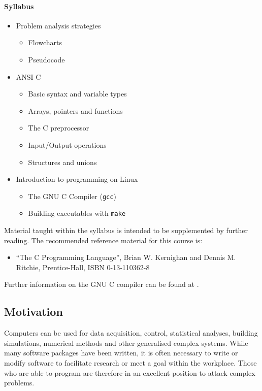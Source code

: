 \documentclass[11pt]{scrartcl}
\def\psc{Pseudocode}
\def\linux{Linux}
\begin{document}
\paragraph{Syllabus}
\begin{itemize}
  \item Problem analysis strategies
  \begin{itemize}
    \item Flowcharts
    \item \psc 
  \end{itemize}
  \item ANSI C
  \begin{itemize}
    \item Basic syntax and variable types
    \item Arrays, pointers and functions
    \item The C preprocessor
    \item Input/Output operations
    \item Structures and unions 
  \end{itemize}
  \item Introduction to programming on \linux
  \begin{itemize}
    \item The GNU C Compiler (\texttt{gcc})
    \item Building executables with \texttt{make} 
  \end{itemize}
\end{itemize}

Material taught within the syllabus is intended to be supplemented by
further reading. The recommended reference material for this course
is:
\begin{itemize}
\item ``The C Programming Language'', Brian W. Kernighan and Dennis M. Ritchie, Prentice-Hall, ISBN 0-13-110362-8
\end{itemize}
Further information on the GNU C compiler can be found at \cite{gcc}.

\subsection{Motivation}
Computers can be used for data acquisition, control, statistical analyses, building simulations, numerical methods and other generalised complex systems.  While many software packages have been written, it is often necessary to write or modify software to facilitate research or meet a goal within the workplace.  Those who are able to program are therefore in an excellent position to attack complex problems.
\end{document}
